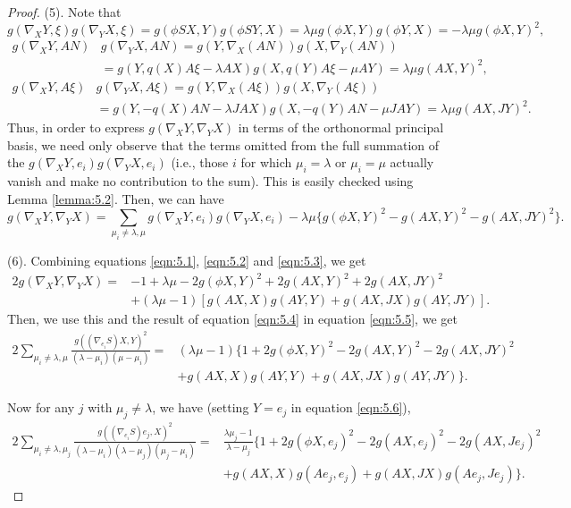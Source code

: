 \documentclass[10pt,a4paper]{amsart}
\begin{document}
\begin{proof}
(5). Note that
$$
g(\nabla_X Y,\xi)g(\nabla_Y X,\xi)=g(\phi SX,Y)g(\phi SY,X)=\lambda\mu g(\phi X,Y)g(\phi Y,X)=-\lambda\mu g(\phi X,Y)^2,
$$
$$
\begin{aligned}
g(\nabla_X Y,AN)&g(\nabla_Y X,AN)=g(Y,\nabla_X (AN))g(X,\nabla_Y (AN))\\
&=g(Y,q(X)A\xi-\lambda AX)g(X,q(Y)A\xi-\mu AY)
=\lambda\mu g(AX,Y)^2,
\end{aligned}
$$
$$
\begin{aligned}
g(\nabla_X Y,A\xi)&g(\nabla_Y X,A\xi)=g(Y,\nabla_X (A\xi))g(X,\nabla_Y (A\xi))\\
&=g(Y,-q(X)AN-\lambda JAX)g(X,-q(Y)AN-\mu JAY)=\lambda\mu g(AX,JY)^2.
\end{aligned}
$$
Thus, in order to express $g(\nabla_X Y,\nabla_Y X)$ in terms of the orthonormal principal basis,
we need only observe that the terms omitted from the full summation of
the $g(\nabla_X Y,e_i)g(\nabla_Y X,e_i)$ (i.e., those $i$ for which $\mu_i=\lambda$ or $\mu_i=\mu$
actually vanish and make no contribution to the sum). This is easily checked using Lemma \ref{lemma:5.2}.
Then, we can have
%
\begin{equation}\label{eqn:5.5}
g(\nabla_X Y,\nabla_Y X)=\sum_{\mu_i\neq\lambda,\mu}g(\nabla_X Y,e_i)g(\nabla_Y X,e_i)
-\lambda\mu\Big\{g(\phi X,Y)^2-g(AX,Y)^2-g(AX,JY)^2\Big\}.
\end{equation}

(6). Combining equations \eqref{eqn:5.1}, \eqref{eqn:5.2} and \eqref{eqn:5.3}, we get
$$
\begin{aligned}
2g(\nabla_X Y,\nabla_Y X)=&-1+\lambda\mu-2g(\phi X,Y)^2+2g(AX,Y)^2+2g(AX,JY)^2\\
&+(\lambda\mu-1)[g(AX,X)g(AY,Y)+g(AX,JX)g(AY,JY)].
\end{aligned}
$$
Then, we use this and the result of equation \eqref{eqn:5.4} in equation \eqref{eqn:5.5}, we get
%
\begin{equation}\label{eqn:5.6}
\begin{aligned}
2\sum_{\mu_i\neq\lambda,\mu}\frac{g((\nabla_{e_i} S)X,Y)^2}{(\lambda-\mu_i)(\mu-\mu_i)}
=&(\lambda\mu-1)\Big\{1+2g(\phi X,Y)^2-2g(AX,Y)^2-2g(AX,JY)^2\\
&   +g(AX,X)g(AY,Y)+g(AX,JX)g(AY,JY)\Big\}.
\end{aligned}
\end{equation}

Now for any $j$ with $\mu_j\neq\lambda$, we have (setting $Y=e_j$ in equation \eqref{eqn:5.6}),
%
\begin{equation}\label{eqn:5.7}
\begin{aligned}
2\sum_{\mu_i\neq\lambda,\mu_j}\frac{g((\nabla_{e_i} S)e_j,X)^2}{(\lambda-\mu_i)(\lambda-\mu_j)(\mu_j-\mu_i)}
=&\frac{\lambda\mu_j-1}{\lambda-\mu_j}\Big\{1+2g(\phi X,e_j)^2-2g(AX,e_j)^2-2g(AX,Je_j)^2\\
&   +g(AX,X)g(Ae_j,e_j)+g(AX,JX)g(Ae_j,Je_j)\Big\}.
\end{aligned}
\end{equation}


\end{proof}
\end{document}
